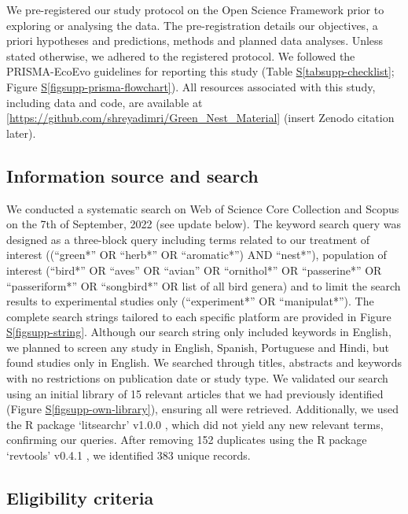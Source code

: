 \documentclass[
  number,
  review,
  onecolumn]{elsarticle}
\newcommand*\quartofigsuppref[1]{Figure \hyperref[#1]{S\ref{#1}}}
\newcommand*\quartotabsuppref[1]{Table \hyperref[#1]{S\ref{#1}}}
\begin{document}
We pre-registered our study protocol on the Open Science Framework
\citep{dimri2024} prior to exploring or analysing the data. The
pre-registration details our objectives, a priori hypotheses and
predictions, methods and planned data analyses. Unless stated otherwise,
we adhered to the registered protocol. We followed the PRISMA-EcoEvo
guidelines \citep{odea2021} for reporting this study
(\quartotabsuppref{tabsupp-checklist};
\quartofigsuppref{figsupp-prisma-flowchart}). All resources associated
with this study, including data and code, are available at
{[}\url{https://github.com/shreyadimri/Green_Nest_Material}{]} (insert
Zenodo citation later).

\subsection{Information source and
search}\label{information-source-and-search}

We conducted a systematic search on Web of Science Core Collection and
Scopus on the 7th of September, 2022 (see update below). The keyword
search query was designed as a three-block query including terms related
to our treatment of interest ((``green*'' OR ``herb*'' OR ``aromatic*'')
AND ``nest*''), population of interest (``bird*'' OR ``aves'' OR
``avian'' OR ``ornithol*'' OR ``passerine*'' OR ``passeriform*'' OR
``songbird*'' OR list of all bird genera) and to limit the search
results to experimental studies only (``experiment*'' OR
``manipulat*''). The complete search strings tailored to each specific
platform are provided in \quartofigsuppref{figsupp-string}. Although our
search string only included keywords in English, we planned to screen
any study in English, Spanish, Portuguese and Hindi, but found studies
only in English. We searched through titles, abstracts and keywords with
no restrictions on publication date or study type. We validated our
search using an initial library of 15 relevant articles that we had
previously identified (\quartofigsuppref{figsupp-own-library}), ensuring
all were retrieved. Additionally, we used the R package `litsearchr'
v1.0.0 \citep{grames2019}, which did not yield any new relevant terms,
confirming our queries. After removing 152 duplicates using the R
package `revtools' v0.4.1 \citep{westgate2019}, we identified 383 unique
records.

\subsection{Eligibility criteria}\label{eligibility-criteria}
\end{document}
